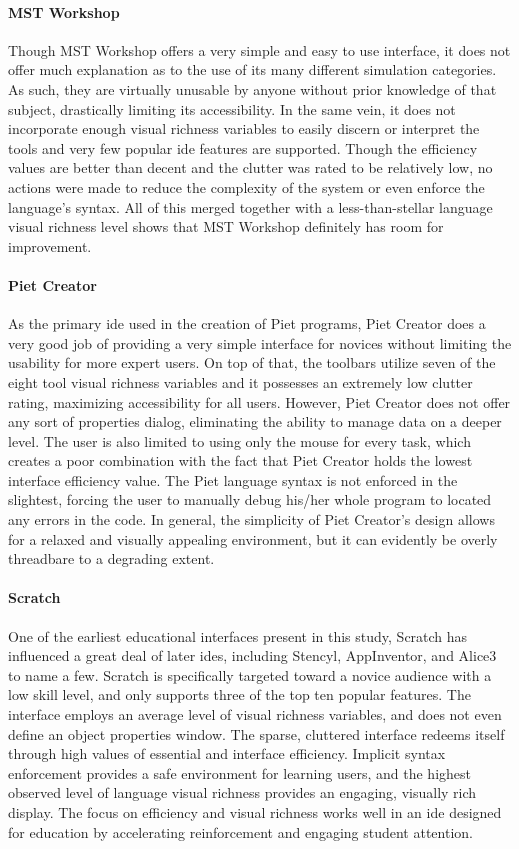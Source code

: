 \paragraph{MST Workshop} Though MST Workshop offers a very simple and
easy to use interface, it does not offer much explanation as to the use of
its many different simulation categories. As such, they are virtually
unusable by anyone without prior knowledge of that subject, drastically
limiting its accessibility. In the same vein, it does not incorporate
enough visual richness variables to easily discern or interpret the tools
and very few popular \ac{ide} features are supported. Though the efficiency
values are better than decent and the clutter was rated to be relatively
low, no actions were made to reduce the complexity of the system or even
enforce the language's syntax. All of this merged together with a
less-than-stellar language visual richness level shows that MST Workshop
definitely has room for improvement.

\paragraph{Piet Creator} As the primary \ac{ide} used in the creation of
Piet programs, Piet Creator does a very good job of providing a very simple
interface for novices without limiting the usability for more expert users.
On top of that, the toolbars utilize seven of the eight tool visual
richness variables and it possesses an extremely low clutter rating,
maximizing accessibility for all users.  However, Piet Creator does not
offer any sort of properties dialog, eliminating the ability to manage data
on a deeper level. The user is also limited to using only the mouse for
every task, which creates a poor combination with the fact that Piet
Creator holds the lowest interface efficiency value. The Piet language
syntax is not enforced in the slightest, forcing the user to manually debug
his/her whole program to located any errors in the code. In general, the
simplicity of Piet Creator's design allows for a relaxed and visually
appealing environment, but it can evidently be overly threadbare to a
degrading extent.

\paragraph{Scratch} One of the earliest educational interfaces present in
this study, Scratch has influenced a great deal of later \acp{ide},
including Stencyl, AppInventor, and Alice3 to name a few. Scratch is
specifically targeted toward a novice audience with a low skill level, and
only supports three of the top ten popular features. The interface employs
an average level of visual richness variables, and does not even define an
object properties window. The sparse, cluttered interface redeems itself
through high values of essential and interface efficiency. Implicit syntax
enforcement provides a safe environment for learning users, and the highest
observed level of language visual richness provides an engaging, visually
rich display. The focus on efficiency and visual richness works well in an
\ac{ide} designed for education by accelerating reinforcement and engaging
student attention.

